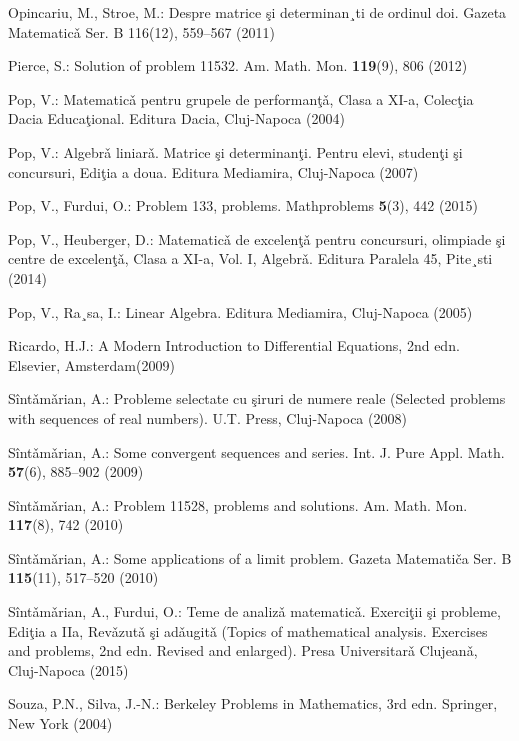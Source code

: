 \begin{thebibliography}{99}
  Opincariu, M., Stroe, M.: Despre matrice \c si determinan¸ti de ordinul doi. Gazeta Matematic\v a
  Ser. B 116(12), 559–567 (2011)

  Pierce, S.: Solution of problem 11532. Am. Math. Mon. \textbf{119}(9), 806 (2012)

  Pop, V.: Matematic\v a pentru grupele de performan\c t\v a, Clasa a XI-a, Colec\c tia Dacia Educa\c tional.
  Editura Dacia, Cluj-Napoca (2004)

  Pop, V.: Algebr\v a liniar\v a. Matrice \c si determinan\c ti. Pentru elevi, studen\c ti \c si concursuri, Edi\c tia a doua. Editura Mediamira, Cluj-Napoca (2007)

  Pop, V., Furdui, O.: Problem 133, problems. Mathproblems \textbf{5}(3), 442 (2015)

  Pop, V., Heuberger, D.: Matematic\v a de excelen\c t\v a pentru concursuri, olimpiade \c si centre de
  excelen\c t\v a, Clasa a XI-a, Vol. I, Algebr\v a. Editura Paralela 45, Pite¸sti (2014)

  Pop, V., Ra¸sa, I.: Linear Algebra. Editura Mediamira, Cluj-Napoca (2005)

  Ricardo, H.J.: A Modern Introduction to Differential Equations, 2nd edn. Elsevier, Amsterdam(2009)

  S\^int\v am\v arian, A.: Probleme selectate cu \c siruri de numere reale (Selected problems with sequences of real numbers). U.T. Press, Cluj-Napoca (2008)

  S\^int\v am\v arian, A.: Some convergent sequences and series. Int. J. Pure Appl. Math. \textbf{57}(6), 885–902 (2009)

  S\^int\v am\v arian, A.: Problem 11528, problems and solutions. Am. Math. Mon. \textbf{117}(8), 742 (2010)

  S\^int\v am\v arian, A.: Some applications of a limit problem. Gazeta Matemati\v ca Ser. B \textbf{115}(11), 517–520 (2010)

  S\^int\v am\v arian, A., Furdui, O.: Teme de analiz\v a matematic\v a. Exerci\c tii \c si probleme, Edi\c tia a IIa,
  Rev\v azut\v a \c si ad\v augit\v a (Topics of mathematical analysis. Exercises and problems, 2nd edn. Revised and enlarged). Presa Universitar\v a Clujean\v a, Cluj-Napoca (2015)

  Souza, P.N., Silva, J.-N.: Berkeley Problems in Mathematics, 3rd edn. Springer, New York (2004)


\end{thebibliography}
